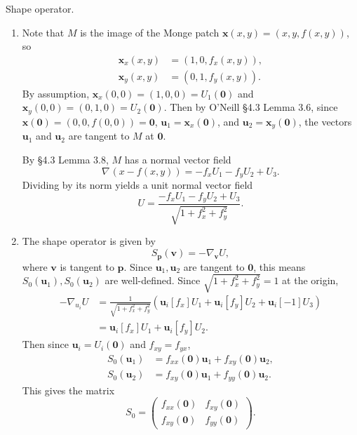 \documentclass[twoside,10pt]{report}
\begin{document}
\newpage
\begin{exer}[]
Shape operator.
\end{exer}
\begin{enumerate}
	\item Note that $M$ is the image of the Monge patch $\mathbf{x}(x,y) = (x,y,f(x,y))$, so
		\begin{align*}
			\mathbf{x}_{x}(x,y)&=(1,0,f_{x}(x,y)),\\
			\mathbf{x}_{y}(x,y)&=(0,1,f_{y}(x,y)).
		\end{align*}
		By assumption, $\mathbf{x}_{x}(0,0) = (1,0,0)=U_{1}(\mathbf{0})$ and $\mathbf{x}_{y}(0,0)=(0,1,0)=U_{2}(\mathbf{0})$. Then by O'Neill \S 4.3 Lemma 3.6, since $\mathbf{x}(\mathbf{0}) = (0,0,f(0,0))=\mathbf{0}$, $\mathbf{u}_{1}=\mathbf{x}_{x}(\mathbf{0})$, and $\mathbf{u}_{2}=\mathbf{x}_{y}(\mathbf{0})$, the vectors $\mathbf{u}_{1}$ and $\mathbf{u}_{2}$ are tangent to $M$ at $\mathbf{0}$.

		By \S 4.3 Lemma 3.8, $M$ has a normal vector field
		\[
			\nabla_{}(x-f(x,y)) = -f_{x}U_1-f_{y}U_2+U_3.
		\] Dividing by its norm yields a unit normal vector field
		\[
		U = \frac{-f_{x}U_1-f_{y}U_2+U_3}{\sqrt{1+f_{x}^{2}+f_{y}^2} } .
		\] 

	\item The shape operator is given by
		\[
			S_{\mathbf{p}}(\mathbf{v}) = -\nabla_{\mathbf{v}}U,
		\] where $\mathbf{v}$ is tangent to $\mathbf{p}$. Since $\mathbf{u}_{1},\mathbf{u}_{2}$ are tangent to $\mathbf{0}$, this means $S_{0}(\mathbf{u}_{1}), S_{0}(\mathbf{u}_{2})$ are well-defined. Since $\sqrt{1+f_{x}^{2}+f_{y}^2}=1$ at the origin,
		\begin{align*}
			-\nabla_{u_i}U &= \frac{1}{\sqrt{1+f_{x}^{2}+f_{y}^2}}\left( \mathbf{u}_{i}[f_{x}]U_1+\mathbf{u}_{i}[f_{y}]U_2+\mathbf{u}_{i}[-1]U_3 \right) \\
				       &= \mathbf{u}_{i}[f_{x}]U_1+\mathbf{u}_{i}[f_{y}]U_2.
		\end{align*}
		Then since $\mathbf{u}_{i}=U_{i}(\mathbf{0})$ and $f_{xy}=f_{yx}$,
		\begin{align*}
			S_0(\mathbf{u}_{1})&=f_{xx}(\mathbf{0})\mathbf{u}_{1}+f_{xy}(\mathbf{0})\mathbf{u}_{2}, \\
			S_0(\mathbf{u}_{2})&=f_{xy}(\mathbf{0})\mathbf{u}_{1}+f_{yy}(\mathbf{0})\mathbf{u}_{2}.
		\end{align*}
		This gives the matrix
		\[
			S_0=
		\begin{pmatrix}
			f_{xx}(\mathbf{0})&f_{xy}(\mathbf{0})\\
			f_{xy}(\mathbf{0})&f_{yy}(\mathbf{0})
		\end{pmatrix}.
		\] 


\end{enumerate}
\end{document}
